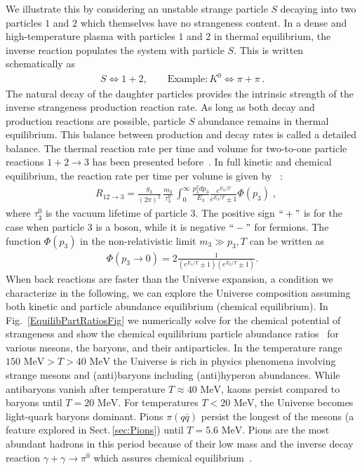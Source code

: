 \documentclass[universe,article,submit,moreauthors,pdftex,a4paper]{Definitions/mdpi}
\newcommand{\MeV}{\text{ MeV}}
\newcommand*{\rf}[1]{Fig.~{\ref{#1}}}
\newcommand*{\rsec}[1]{Sect.\,{\ref{#1}}}
\begin{document}
We illustrate this by considering an unstable strange particle $S$ decaying into two particles $1$ and $2$ which themselves have no strangeness content. In a dense and high-temperature plasma with particles $1$ and $2$ in thermal equilibrium, the inverse reaction populates the system with particle $S$. This is written schematically as
\begin{align}
 S\Longleftrightarrow1+2,\qquad \mathrm{Example}: K^0\Longleftrightarrow\pi+\pi\,.
\end{align}
The natural decay of the daughter particles provides the intrinsic strength of the inverse strangeness production reaction rate. As long as both decay and production reactions are possible, particle $S$ abundance remains in thermal equilibrium. This balance between production and decay rates is called a detailed balance. The thermal reaction rate per time and volume for two-to-one particle reactions $1+2\rightarrow 3$ has been presented before~\cite{Kuznetsova:2008jt,Kuznetsova:2010pi}. In full kinetic and chemical equilibrium, the reaction rate per time per volume is given by~\cite{Kuznetsova:2010pi} :
\begin{align}
&R_{12\to 3}=\frac{g_3}{(2\pi)^2}\,\frac{m_3}{\tau^0_3}\,\int^\infty_0\frac{p^2_3dp_3}{E_3}\frac{e^{E_3/T}}{e^{E_3/T}\pm1}\Phi(p_3)\;,
\end{align}
where $\tau^0_3$ is the vacuum lifetime of particle $3$. The positive sign $``+"$ is for the case when particle $3$ is a boson, while it is negative $``-"$ for fermions. The function $\Phi(p_3)$ in the non-relativistic limit $m_3\gg p_3,T$ can be written as 
\begin{align}\label{photonfusion}
\Phi(p_3\to0)=2\frac{1}{(e^{E_1/T}\pm1)(e^{E_2/T}\pm1)}.
\end{align}
When back reactions are faster than the Universe expansion, a condition we characterize in the following, we can explore the Universe composition assuming both kinetic and particle abundance equilibrium (chemical equilibrium). In \rf{EquilibPartRatiosFig} we numerically solve for the chemical potential of strangeness and show the chemical equilibrium particle abundance ratios~\cite{Yang:2021bko} for various mesons, the baryons, and their antiparticles. In the temperature range $150\MeV>T>40\MeV$ the Universe is rich in physics phenomena involving strange mesons and (anti)baryons including (anti)hyperon abundances. While antibaryons vanish after temperature $T\approx40\MeV$, kaons persist compared to baryons until $T=20\MeV$. For temperatures $T<20\MeV$, the Universe becomes light-quark baryons  dominant. Pions $\pi(q\bar q)$ persist the longest of the mesons (a feature explored in \rsec{sec:Pions}) until $T=5.6\MeV$. Pions are the most abundant hadrons in this period because of their low mass and the inverse decay reaction $\gamma+\gamma\rightarrow\pi^0$ which assures chemical equilibrium~\cite{Kuznetsova:2008jt}.
\end{document}
